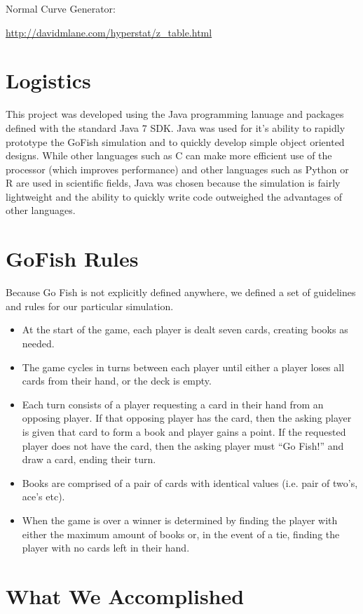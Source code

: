 \documentclass[preprint,12pt]{elsarticle}
\begin{document}
\noindent Normal Curve Generator: 

\noindent\url{http://davidmlane.com/hyperstat/z_table.html}

\section{Logistics}
\label{P:2}

This project was developed using the Java programming lanuage and packages defined with the standard Java 7 SDK. Java was used for it's ability to rapidly prototype the GoFish simulation and to quickly develop simple object oriented designs. While other languages such as C can make more efficient use of the processor (which improves performance) and other languages such as Python or R are used in scientific fields, Java was chosen because the simulation is fairly lightweight and the ability to quickly write code outweighed the advantages of other languages. 

\section{GoFish Rules}
\label{P:3}
Because Go Fish is not explicitly defined anywhere, we defined a set of guidelines and rules for our particular simulation.

\begin{itemize}
\item At the start of the game, each player is dealt seven cards, creating books as needed.
\item The game cycles in turns between each player until either a player loses all cards from their hand, or the deck is empty.
\item Each turn consists of a player requesting a card in their hand from an opposing player. If that opposing player has the card, then the asking player is given that card to form a book and player gains a point. If the requested player does not have the card, then the asking player must “Go Fish!” and draw a card, ending their turn.
\item Books are comprised of a pair of cards with identical values (i.e. pair of two’s, ace’s etc). 
\item When the game is over a winner is determined by finding the player with either the maximum amount of books or, in the event of a tie, finding the player with no cards left in their hand.
\end{itemize}

\section{What We Accomplished}
\label{S:1}
\end{document}

